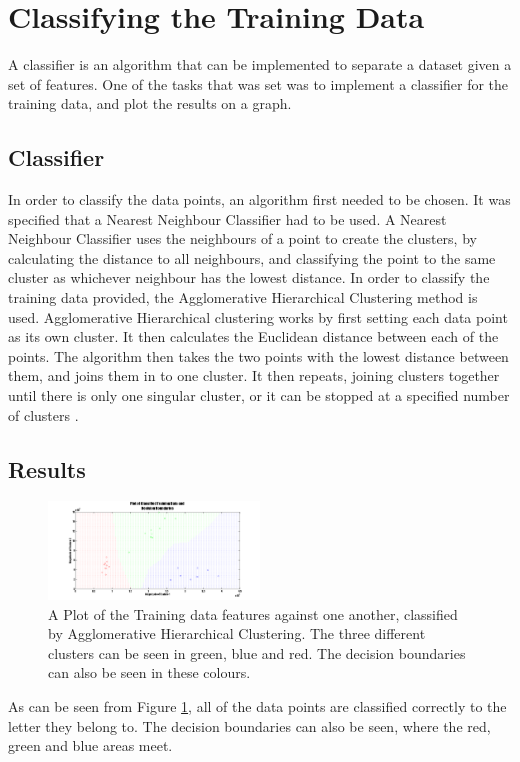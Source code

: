 \documentclass[a4paper]{article}
\begin{document}
\section{Classifying the Training Data}
A classifier is an algorithm that can be implemented to separate a dataset given a set of features. One of the tasks that was set was to implement a classifier for the training data, and plot the results on a graph.
\subsection{Classifier}
In order to classify the data points, an algorithm first needed to be chosen. It was specified that a Nearest Neighbour Classifier had to be used. A Nearest Neighbour Classifier uses the neighbours of a point to create the clusters, by calculating the distance to all neighbours, and classifying the point to the same cluster as whichever neighbour has the lowest distance. In order to classify the training data provided, the Agglomerative Hierarchical Clustering method is used. 
\newline
Agglomerative Hierarchical clustering works by first setting each data point as its own cluster. It then calculates the Euclidean distance between each of the points. The algorithm then takes the two points with the lowest distance between them, and joins them in to one cluster. It then repeats, joining clusters together until there is only one singular cluster, or it can be stopped at a specified number of clusters \cite{Hierarchical Clustering}. 
\subsection{Results}
\begin{figure}[H]
\centering
\includegraphics[width=0.5\textwidth]{plottrainclass.png}
\caption{\label{fig:plottrainclass}A Plot of the Training data features against one another, classified by Agglomerative Hierarchical Clustering. The three different clusters can be seen in green, blue and red. The decision boundaries can also be seen in these colours.}
\end{figure}
As can be seen from Figure \ref{fig:plottrainclass}, all of the data points are classified correctly to the letter they belong to. The decision boundaries can also be seen, where the red, green and blue areas meet. 
\end{document}
